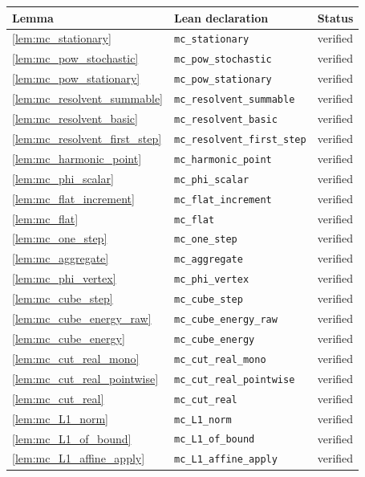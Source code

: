 \documentclass[11pt]{article}
\theoremstyle{definition}
\theoremstyle{remark}
\begin{document}
\begin{longtable}{@{}lll@{}}
\toprule
Lemma & Lean declaration & Status \\
\midrule
\endhead
\cref{lem:mc_stationary} & \texttt{mc\_stationary} & verified \\
\cref{lem:mc_pow_stochastic} & \texttt{mc\_pow\_stochastic} & verified \\
\cref{lem:mc_pow_stationary} & \texttt{mc\_pow\_stationary} & verified \\
\cref{lem:mc_resolvent_summable} & \texttt{mc\_resolvent\_summable} & verified \\
\cref{lem:mc_resolvent_basic} & \texttt{mc\_resolvent\_basic} & verified \\
\cref{lem:mc_resolvent_first_step} & \texttt{mc\_resolvent\_first\_step} & verified \\
\cref{lem:mc_harmonic_point} & \texttt{mc\_harmonic\_point} & verified \\
\cref{lem:mc_phi_scalar} & \texttt{mc\_phi\_scalar} & verified \\
\cref{lem:mc_flat_increment} & \texttt{mc\_flat\_increment} & verified \\
\cref{lem:mc_flat} & \texttt{mc\_flat} & verified \\
\cref{lem:mc_one_step} & \texttt{mc\_one\_step} & verified \\
\cref{lem:mc_aggregate} & \texttt{mc\_aggregate} & verified \\
\cref{lem:mc_phi_vertex} & \texttt{mc\_phi\_vertex} & verified \\
\cref{lem:mc_cube_step} & \texttt{mc\_cube\_step} & verified \\
\cref{lem:mc_cube_energy_raw} & \texttt{mc\_cube\_energy\_raw} & verified \\
\cref{lem:mc_cube_energy} & \texttt{mc\_cube\_energy} & verified \\
\cref{lem:mc_cut_real_mono} & \texttt{mc\_cut\_real\_mono} & verified \\
\cref{lem:mc_cut_real_pointwise} & \texttt{mc\_cut\_real\_pointwise} & verified \\
\cref{lem:mc_cut_real} & \texttt{mc\_cut\_real} & verified \\
\cref{lem:mc_L1_norm} & \texttt{mc\_L1\_norm} & verified \\
\cref{lem:mc_L1_of_bound} & \texttt{mc\_L1\_of\_bound} & verified \\
\cref{lem:mc_L1_affine_apply} & \texttt{mc\_L1\_affine\_apply} & verified \\

\end{longtable}
\end{document}
